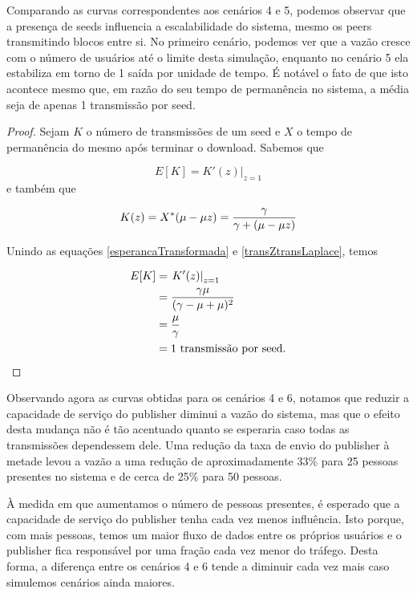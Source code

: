 \documentclass[a4paper,10pt]{article}
\begin{document}
Comparando as curvas correspondentes aos cenários 4 e 5, podemos observar que a presença de seeds influencia a escalabilidade do sistema, mesmo os peers transmitindo blocos entre si. No primeiro cenário, podemos ver que a vazão cresce com o número de usuários até o limite desta simulação, enquanto no cenário 5 ela estabiliza em torno de 1 saída por unidade de tempo. É notável o fato de que isto acontece mesmo que, em razão do seu tempo de permanência no sistema, a média seja de apenas 1 transmissão por seed.

\begin{proof}

Sejam $K$ o número de transmissões de um seed e $X$ o tempo de permanência do mesmo após terminar o download. Sabemos que

\begin{equation}\label{esperancaTransformada}
	E[K] =\left. K'(z) \right |_{z = 1}
\end{equation}
e também que

\begin{equation}\label{transZtransLaplace}
	K(z) = X^*(\mu - \mu z) = {{\gamma} \over {\gamma + (\mu - \mu z)}}
\end{equation}

Unindo as equações \ref{esperancaTransformada} e \ref{transZtransLaplace}, temos

\begin{align}
	E[K] &= \left. K'(z) \right |_{z = 1} \\
	&= {{\gamma \mu} \over {(\gamma - \mu + \mu)^2}} \\
	&= {{\mu} \over {\gamma}} \\
	&= 1 \text{ transmissão por seed.}
\end{align}
\end{proof}

Observando agora as curvas obtidas para os cenários 4 e 6, notamos que reduzir a capacidade de serviço do publisher diminui a vazão do sistema, mas que o efeito desta mudança não é tão acentuado quanto se esperaria caso todas as transmissões dependessem dele. Uma redução da taxa de envio do publisher à metade levou a vazão a uma redução de aproximadamente 33\% para 25 pessoas presentes no sistema e de cerca de 25\% para 50 pessoas.

À medida em que aumentamos o número de pessoas presentes, é esperado que a capacidade de serviço do publisher tenha cada vez menos influência. Isto porque, com mais pessoas, temos um maior fluxo de dados entre os próprios usuários e o publisher fica responsável por uma fração cada vez menor do tráfego. Desta forma, a diferença entre os cenários 4 e 6 tende a diminuir cada vez mais caso simulemos cenários ainda maiores.
\end{document}
